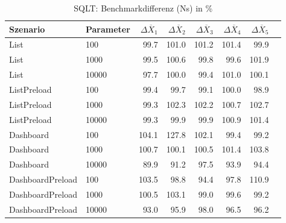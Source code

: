 
\begin{table}[ht]
\setlength{\extrarowheight}{-1pt}
\centering
\caption{SQLT: Benchmarkdifferenz (Ns) in \%}
\begin{tabular}{llrrrrrr}
\toprule
Szenario & Parameter & ${\Delta \overline{X}_1}$ & ${\Delta \overline{X}_2}$ & ${\Delta \overline{X}_3}$ & ${\Delta \overline{X}_4}$ & ${\Delta \overline{X}_5}$ \\
\midrule
	List & 100 &  99.7 &  101.0 &  101.2 &  101.4 &  99.9 \\
	List & 1000 &  99.5 &  100.6 &  99.8 &  99.6 &  101.9 \\
	List & 10000 & \cellcolor{green!11}  97.7 &  100.0 &  99.4 &  101.0 &  100.1 \\
	ListPreload & 100 &  99.4 &  99.7 &  99.1 &  100.0 &  98.9 \\
	ListPreload & 1000 &  99.3 & \cellcolor{red!11}  102.3 & \cellcolor{red!11}  102.2 &  100.7 & \cellcolor{red!11}  102.7 \\
	ListPreload & 10000 &  99.3 &  99.9 &  99.9 &  100.9 &  101.4 \\
	Dashboard & 100 & \cellcolor{red!12}  104.1 & \cellcolor{red!21}  127.8 & \cellcolor{red!11}  102.1 &  99.4 &  99.2 \\
	Dashboard & 1000 &  100.7 &  100.1 &  100.5 &  101.4 & \cellcolor{red!12}  103.8 \\
	Dashboard & 10000 & \cellcolor{green!14}  89.9 & \cellcolor{green!14}  91.2 & \cellcolor{green!11}  97.5 & \cellcolor{green!12}  93.9 & \cellcolor{green!12}  94.4 \\
	DashboardPreload & 100 & \cellcolor{red!11}  103.5 &  98.8 & \cellcolor{green!12}  94.4 & \cellcolor{green!11}  97.8 & \cellcolor{red!14}  110.9 \\
	DashboardPreload & 1000 &  100.5 & \cellcolor{red!11}  103.1 &  99.0 &  99.6 &  99.2 \\
	DashboardPreload & 10000 & \cellcolor{green!13}  93.0 & \cellcolor{green!12}  95.9 & \cellcolor{green!11}  98.0 & \cellcolor{green!11}  96.5 & \cellcolor{green!12}  96.2 \\
\bottomrule
\end{tabular}
\label{tab:benchmarkdifferenz_sqlt_ns}
\end{table}
	